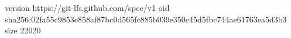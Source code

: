 version https://git-lfs.github.com/spec/v1
oid sha256:02fa55c9853e858af87bc0d565fc885b039e350c45d5fbc744ae61763ea5d3b3
size 22020
